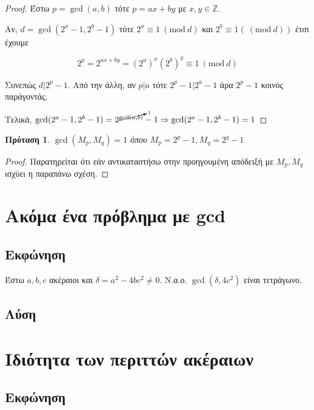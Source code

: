 \documentclass[oneside]{article}
\newtheorem*{lemma}{Πρόταση}
\newcommand{\Mod}[1]{\ (\mathrm{mod}\ #1)}
\begin{document}
\begin{proof}
    Έστω $p = \gcd(a,b)$ τότε $p = ax + by$ με $x, y \in \mathbb{Z}$.
    
    Αν, $d = \gcd(2^a-1,2^b-1)$ τότε $2^a \equiv 1 \Mod{d}$ και $2^b \equiv 1 (\Mod{d})$ έτσι έχουμε

    \begin{equation}
        2^p = 2^{ax+by} = (2^a)^x(2^b)^y \equiv 1 \Mod{d}
    \end{equation}

    Συνεπώς $d | 2^p - 1$.
    Από την άλλη, αν $p | a$ τότε $2^p - 1 | 2^a - 1$ άρα $2^p - 1$ κοινός παράγοντάς.
    
    Τελικά, $\gcd(2^a - 1, 2^b - 1) = 2^{\cancelto{1}{{\gcd(a,b)}}} - 1 \Rightarrow \gcd(2^a - 1, 2^b - 1) = 1$
\end{proof}

\begin{lemma}
    $\gcd(M_p, M_q) = 1$ όπου $M_p = 2^p - 1, M_q = 2^q - 1$
\end{lemma}

\begin{proof}
    Παρατηρείται ότι εάν αντικαταστήσω στην προηγουμένη απόδειξή με $M_p, M_q$ ισχύει η παραπάνω σχέση.
\end{proof}


\section{Ακόμα ένα πρόβλημα με gcd}

\subsection{Εκφώνηση}

Έστω $a, b, c$ ακέραιοι και $\delta = a^2 - 4bc^2 \neq 0$. Ν.α.ο. $\gcd(\delta, 4c^2)$ είναι τετράγωνο.

\subsection{Λύση} 

\section{Ιδιότητα των περιττών ακέραιων}

\subsection{Εκφώνηση}
\end{document}
